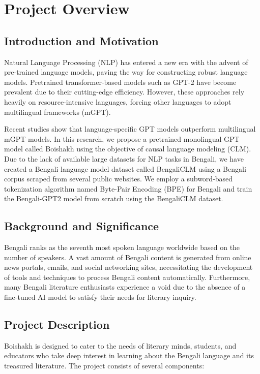 \section{Project Overview}
\sloppy

\subsection{Introduction and Motivation}
Natural Language Processing (NLP) has entered a new era with the advent of pre-trained language models, paving the way for constructing robust language models. Pretrained transformer-based models such as GPT-2 have become prevalent due to their cutting-edge efficiency. However, these approaches rely heavily on resource-intensive languages, forcing other languages to adopt multilingual frameworks (mGPT).

Recent studies show that language-specific GPT models outperform multilingual mGPT models. In this research, we propose a pretrained monolingual GPT model called Boishakh using the objective of causal language modeling (CLM). Due to the lack of available large datasets for NLP tasks in Bengali, we have created a Bengali language model dataset called BengaliCLM using a Bengali corpus scraped from several public websites. We employ a subword-based tokenization algorithm named Byte-Pair Encoding (BPE) for Bengali and train the Bengali-GPT2 model from scratch using the BengaliCLM dataset.

\subsection{Background and Significance}
Bengali ranks as the seventh most spoken language worldwide based on the number of speakers. A vast amount of Bengali content is generated from online news portals, emails, and social networking sites, necessitating the development of tools and techniques to process Bengali content automatically. Furthermore, many Bengali literature enthusiasts experience a void due to the absence of a fine-tuned AI model to satisfy their needs for literary inquiry.

\subsection{Project Description}
Boishakh is designed to cater to the needs of literary minds, students, and educators who take deep interest in learning about the Bengali language and its treasured literature. The project consists of several components:

